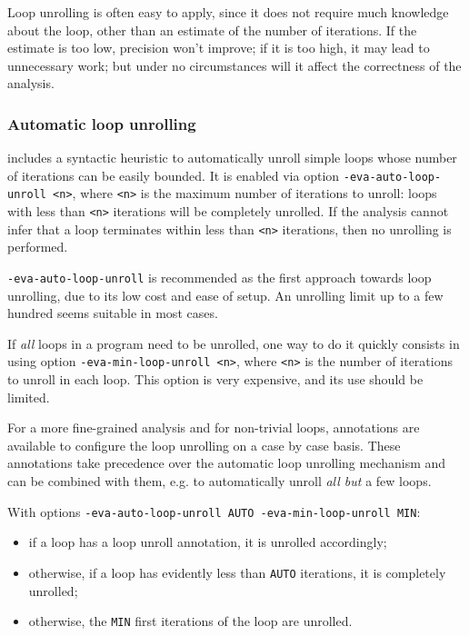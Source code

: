\documentclass{frama-c-book}
\begin{document}
Loop unrolling is often easy to apply, since it does not require much
knowledge about the loop, other than an estimate of the number of iterations.
If the estimate is too low, precision won't improve; if it is too high,
it may lead to unnecessary work; but under no circumstances will it affect the
correctness of the analysis.

\subsubsection{Automatic loop unrolling}

\Eva{} includes a syntactic heuristic to automatically unroll simple loops
whose number of iterations can be easily bounded.
It is enabled via option \lstinline|-eva-auto-loop-unroll <n>|, where
\lstinline|<n>| is the maximum number of iterations to unroll: loops with
less than \lstinline|<n>| iterations will be completely unrolled.
If the analysis cannot infer that a loop terminates within less than
\lstinline|<n>| iterations, then no unrolling is performed.

\lstinline|-eva-auto-loop-unroll| is recommended as the first approach towards
loop unrolling, due to its low cost and ease of setup. An unrolling limit
up to a few hundred seems suitable in most cases.

If \emph{all} loops in a program need to be unrolled, one way to do it quickly
consists in using option \lstinline|-eva-min-loop-unroll <n>|,
where \lstinline|<n>| is the number of iterations to unroll in each loop.
This option is very expensive, and its use should be limited.

For a more fine-grained analysis and for non-trivial loops,
annotations are available to configure the loop unrolling on a case by case
basis.
These annotations take precedence over the automatic loop unrolling mechanism
and can be combined with them, e.g. to automatically unroll {\em all but} a few
loops.

With options \lstinline|-eva-auto-loop-unroll AUTO -eva-min-loop-unroll MIN|:
\begin{itemize}
\item if a loop has a loop unroll annotation, it is unrolled accordingly;
\item otherwise, if a loop has evidently less than \lstinline|AUTO| iterations,
  it is completely unrolled;
\item otherwise, the \lstinline|MIN| first iterations of the loop are unrolled.
\end{itemize}
\end{document}
